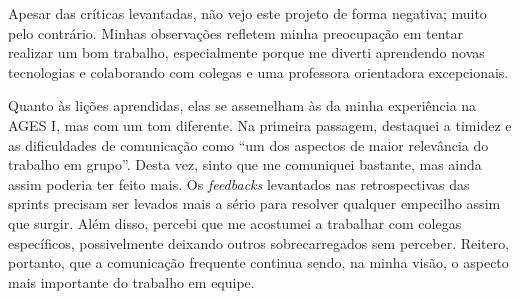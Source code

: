 Apesar das críticas levantadas, não vejo este projeto de forma negativa; muito pelo contrário. Minhas observações refletem minha preocupação
em tentar realizar um bom trabalho, especialmente porque me diverti aprendendo novas tecnologias e colaborando com colegas e uma professora orientadora
excepcionais.

Quanto às lições aprendidas, elas se assemelham às da minha experiência na AGES I, mas com um tom diferente. Na primeira passagem, destaquei a timidez e
as dificuldades de comunicação como “um dos aspectos de maior relevância do trabalho em grupo”. Desta vez, sinto que me comuniquei bastante, mas ainda assim
poderia ter feito mais. Os \textit{feedbacks} levantados nas retrospectivas das sprints precisam ser levados mais a sério para resolver qualquer empecilho assim que surgir.
Além disso, percebi que me acostumei a trabalhar com colegas específicos, possivelmente deixando outros sobrecarregados sem perceber. Reitero, portanto, que a comunicação
frequente continua sendo, na minha visão, o aspecto mais importante do trabalho em equipe.
